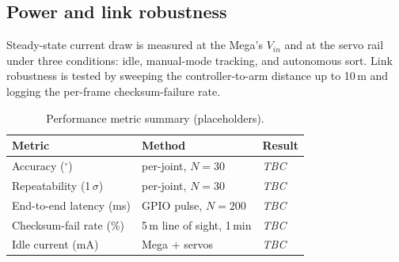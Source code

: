 \subsection{Power and link robustness}
Steady-state current draw is measured at the Mega's $V_{in}$ and at
the servo rail under three conditions: idle, manual-mode tracking,
and autonomous sort. Link robustness is tested by sweeping the
controller-to-arm distance up to 10\,m and logging the per-frame
checksum-failure rate.

\begin{table}[t]
  \centering
  \caption{Performance metric summary (placeholders).}
  \label{tab:results}
  \footnotesize
  \begin{tabularx}{\columnwidth}{lXl}
    \toprule
    \textbf{Metric} & \textbf{Method} & \textbf{Result} \\
    \midrule
    Accuracy ($^\circ$)        & per-joint, $N=30$           & \emph{TBC} \\
    Repeatability (1\,$\sigma$)& per-joint, $N=30$           & \emph{TBC} \\
    End-to-end latency (ms)    & GPIO pulse, $N=200$         & \emph{TBC} \\
    Checksum-fail rate (\%)    & 5\,m line of sight, 1\,min  & \emph{TBC} \\
    Idle current (mA)          & Mega + servos               & \emph{TBC} \\
    \bottomrule
  \end{tabularx}
\end{table}



